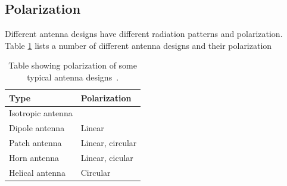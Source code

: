 
\subsection{Polarization} \label{ss:polarization}
Different antenna designs have different radiation patterns and polarization. Table \ref{tab:antenna_types} lists a number of different antenna designs and their polarization
\begin{table}[H]
    \centering
    \begin{tabular}{l|l} 
        \textbf{Type} & \textbf{Polarization} \\
        \hline
        \hline
        Isotropic antenna & \\
        Dipole antenna & Linear \\
        Patch antenna & Linear, circular \\
        Horn antenna & Linear, cicular \\
        Helical antenna & Circular \\
    \end{tabular}
    \caption{Table showing polarization of some typical antenna designs~\cite[p. 11]{ant_beam_form}.}
    \label{tab:antenna_types}
\end{table}


